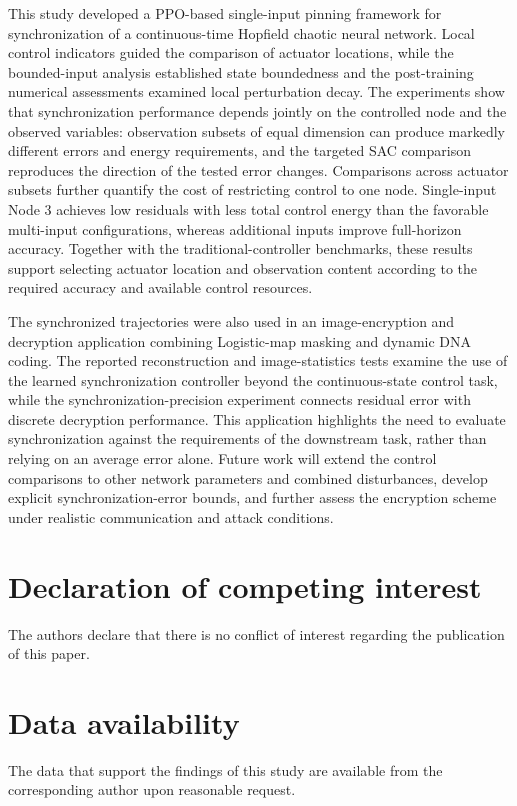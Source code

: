 \documentclass[a4paper,fleqn]{cas-dc}
\theoremstyle{plain}
\theoremstyle{definition}
\begin{document}
This study developed a PPO-based single-input pinning framework for synchronization of a continuous-time Hopfield chaotic neural network. Local control indicators guided the comparison of actuator locations, while the bounded-input analysis established state boundedness and the post-training numerical assessments examined local perturbation decay. The experiments show that synchronization performance depends jointly on the controlled node and the observed variables: observation subsets of equal dimension can produce markedly different errors and energy requirements, and the targeted SAC comparison reproduces the direction of the tested error changes. Comparisons across actuator subsets further quantify the cost of restricting control to one node. Single-input Node 3 achieves low residuals with less total control energy than the favorable multi-input configurations, whereas additional inputs improve full-horizon accuracy. Together with the traditional-controller benchmarks, these results support selecting actuator location and observation content according to the required accuracy and available control resources.

The synchronized trajectories were also used in an image-encryption and decryption application combining Logistic-map masking and dynamic DNA coding. The reported reconstruction and image-statistics tests examine the use of the learned synchronization controller beyond the continuous-state control task, while the synchronization-precision experiment connects residual error with discrete decryption performance. This application highlights the need to evaluate synchronization against the requirements of the downstream task, rather than relying on an average error alone. Future work will extend the control comparisons to other network parameters and combined disturbances, develop explicit synchronization-error bounds, and further assess the encryption scheme under realistic communication and attack conditions.

\section*{Declaration of competing interest}
The authors declare that there is no conflict of interest regarding the publication of this paper.

%

\section*{Data availability}
The data that support the findings of this study are available from the corresponding author upon reasonable request.

%

%
%


\end{document}

